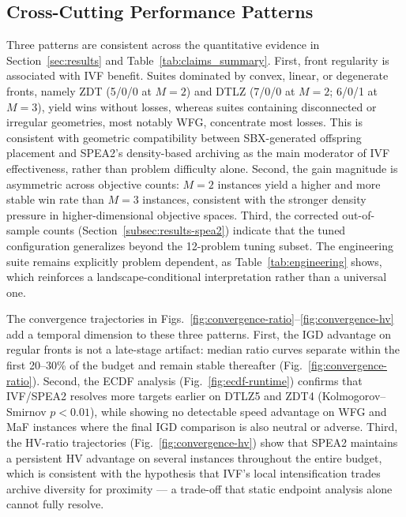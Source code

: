 \documentclass[pdflatex,sn-mathphys-ay]{sn-jnl}%
\theoremstyle{thmstyleone}%
\theoremstyle{thmstyletwo}%
\theoremstyle{thmstylethree}%
\begin{document}
\subsection{Cross-Cutting Performance Patterns}\label{subsec:discussion-patterns}
Three patterns are consistent across the quantitative evidence in Section~\ref{sec:results} and Table~\ref{tab:claims_summary}. First, front regularity is associated with IVF benefit. Suites dominated by convex, linear, or degenerate fronts, namely ZDT (5/0/0 at $M{=}2$) and DTLZ (7/0/0 at $M{=}2$; 6/0/1 at $M{=}3$), yield wins without losses, whereas suites containing disconnected or irregular geometries, most notably WFG, concentrate most losses. This is consistent with geometric compatibility between SBX-generated offspring placement and SPEA2's density-based archiving as the main moderator of IVF effectiveness, rather than problem difficulty alone. Second, the gain magnitude is asymmetric across objective counts: $M=2$ instances yield a higher and more stable win rate than $M=3$ instances, consistent with the stronger density pressure in higher-dimensional objective spaces. Third, the corrected out-of-sample counts (Section~\ref{subsec:results-spea2}) indicate that the tuned configuration generalizes beyond the 12-problem tuning subset. The engineering suite remains explicitly problem dependent, as Table~\ref{tab:engineering} shows, which reinforces a landscape-conditional interpretation rather than a universal one.

The convergence trajectories in Figs.~\ref{fig:convergence-ratio}--\ref{fig:convergence-hv} add a temporal dimension to these three patterns. First, the IGD advantage on regular fronts is not a late-stage artifact: median ratio curves separate within the first 20--30\% of the budget and remain stable thereafter (Fig.~\ref{fig:convergence-ratio}). Second, the ECDF analysis (Fig.~\ref{fig:ecdf-runtime}) confirms that IVF/SPEA2 resolves more targets earlier on DTLZ5 and ZDT4 (Kolmogorov--Smirnov $p < 0.01$), while showing no detectable speed advantage on WFG and MaF instances where the final IGD comparison is also neutral or adverse. Third, the HV-ratio trajectories (Fig.~\ref{fig:convergence-hv}) show that SPEA2 maintains a persistent HV advantage on several instances throughout the entire budget, which is consistent with the hypothesis that IVF's local intensification trades archive diversity for proximity --- a trade-off that static endpoint analysis alone cannot fully resolve.
\end{document}
